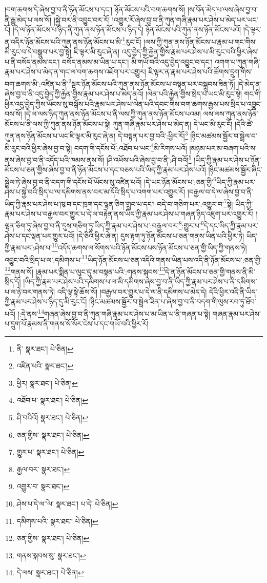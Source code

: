 །བག་ཆགས་དེ་ཞེས་བྱ་བ་ནི་ཉོན་མོངས་པ་དང་། ཉོན་མོངས་པའི་བག་ཆགས་སོ། །ས་བོན་མེད་པ་ལས་ཞེས་བྱ་བ་ནི་རྒྱུ་མེད་པ་ལས་སོ། །སྐྱེ་བར་ནི་འབྱུང་བར་རོ། །འགྱུར་རོ་ཞེས་བྱ་བ་ནི་ཀུན་གཞི་རྣམ་པར་ཤེས་པ་མེད་པར་ཡང་ངོ། །དེ་ལ་ཉོན་མོངས་པ་ཉིད་ནི་ཀུན་ནས་ཉོན་མོངས་པ་ཉིད་དེ། ཉོན་མོངས་པའི་ཀུན་ནས་ཉོན་མོངས་པའོ། །དེ་ལྟར་ན་འདིར་ཉོན་མོངས་པའི་ཀུན་ནས་ཉོན་མོངས་པ་མི་\footnote{ནི་  སྣར་ཐང་།  པེ་ཅིན། }རུང་ངོ། །ལས་ཀྱི་ཀུན་ནས་ཉོན་མོངས་པ་རྣམ་པ་གང་གིས་མི་རུང་བ་དེ་བསྒྲུབ་པར་བྱ་སྟེ། ཇི་ལྟར་མི་རུང་ཞེ་ན། འདུ་བྱེད་ཀྱི་རྐྱེན་གྱིས་རྣམ་པར་ཤེས་པ་མི་རུང་བའི་ཕྱིར་ཞེས་པ་ནི་བསོད་ནམས་དང་། བསོད་ནམས་མ་ཡིན་པ་དང་། མི་གཡོ་བའི་འདུ་བྱེད་འབྱུང་བ་དང་། འགག་པ་ཀུན་གཞི་རྣམ་པར་ཤེས་པ་མེད་ན་གང་ལ་བག་ཆགས་འཇོག་པར་འགྱུར། ཇི་ལྟར་ན་རྣམ་པར་ཤེས་པའི་ཚོགས་དྲུག་གིས་བག་ཆགས་མི་:འཛིན་པ་ནི་\footnote{འཛིན་པའི་  སྣར་ཐང་། }སྔར་ཉོན་མོངས་པའི་ཀུན་ནས་ཉོན་མོངས་པ་བསྟན་པར་བསྒྲུབས་ཟིན་ཏོ། །དེ་མེད་ན་ཞེས་བྱ་བ་ནི་འདུ་བྱེད་ཀྱི་རྐྱེན་གྱིས་རྣམ་པར་ཤེས་པ་མེད་ནའོ། །ལེན་པའི་རྐྱེན་གྱིས་སྲེད་པ་ཡང་མི་རུང་སྟེ། གང་གི་ཕྱིར་འདུ་བྱེད་ཀྱིས་ཡོངས་སུ་བསྒོས་པའི་རྣམ་པར་ཤེས་པ་ལེན་པའི་དབང་གིས་བག་ཆགས་རྒྱས་པས་སྲིད་པ་འབྱུང་བས་སོ། །དེ་ལ་ལས་ཉིད་ཀུན་ནས་ཉོན་མོངས་པ་ནི་ལས་ཀྱི་ཀུན་ནས་ཉོན་མོངས་པའམ། ལས་ལས་ཀུན་ནས་ཉོན་མོངས་པ་ནི་ལས་ཀྱི་ཀུན་ནས་ཉོན་མོངས་པ་སྟེ། ཀུན་གཞི་རྣམ་པར་ཤེས་པ་མེད་ན། དེ་ཡང་མི་རུང་ངོ། །དེའི་ཚེ་ཀུན་ནས་ཉོན་མོངས་པ་ཡང་ཇི་ལྟར་མི་རུང་ཞེ་ན། དེ་བསྟན་པར་བྱ་བའི་:ཕྱིར་རོ།\footnote{ཕྱིར།  སྣར་ཐང་།  པེ་ཅིན། } །ཉིང་མཚམས་སྦྱོར་བ་སྦྲེལ་བ་མི་རུང་བའི་ཕྱིར་ཞེས་བྱ་བ་སྟེ། བདག་གི་དངོས་པོ་:འཐོབ་པ་ཡང་\footnote{འཐོབ་པ་  སྣར་ཐང་།  པེ་ཅིན། }མི་རིགས་པའོ། །མཉམ་པར་མ་བཞག་པའི་ས་ནས་ཞེས་བྱ་བ་ནི་འདོད་པའི་ཁམས་ནས་སོ། །ཤི་འཕོས་པའི་ཞེས་བྱ་བ་ནི་:ཤི་བའོ།\footnote{ཤི་བའིའོ།  སྣར་ཐང་།  པེ་ཅིན། } །ཡིད་ཀྱི་རྣམ་པར་ཤེས་པ་ཉོན་མོངས་པ་ཅན་གྱིས་ཞེས་བྱ་བ་ནི་ཉོན་མོངས་པ་དང་བཅས་པའི་ཡིད་ཀྱི་རྣམ་པར་ཤེས་པའོ། །ཉིང་མཚམས་སྦྱོར་ཞིང་སྦྲེལ་ཏེ་ཞེས་བྱ་བ་ནི་བདག་གི་དངོས་པོ་ཡོངས་སུ་འཛིན་པའོ། །དེ་ཡང་ཉོན་མོངས་པ་:ཅན་གྱི་\footnote{ཅན་གྱིས་  སྣར་ཐང་།  པེ་ཅིན། }ཡིད་ཀྱི་རྣམ་པར་ཤེས་པ་སྐྱེ་བའི་སྲིད་པ་ལ་དམིགས་ནས་བར་མ་དོའི་སྲིད་པ་འགག་པར་འགྱུར་རོ། །བརྒྱལ་བ་དེ་ལ་ཞེས་བྱ་བ་ནི་ཡིད་ཀྱི་རྣམ་པར་ཤེས་པ་ཁུ་བ་དང་ཁྲག་དང་ལྷན་ཅིག་གྲུབ་པ་དང་། བདེ་བ་གཅིག་པར་:འགྱུར་བ་\footnote{གྱུར་པ་  སྣར་ཐང་།  པེ་ཅིན། }སྟེ། ཡིད་ཀྱི་རྣམ་པར་ཤེས་པ་བརྒྱལ་བར་གྱུར་པ་དེ་ལ་བརྟེན་ནས་ཡིད་ཀྱི་རྣམ་པར་ཤེས་པ་གཞན་ཉིད་འཇུག་པར་འགྱུར་རོ། །ལྷན་ཅིག་ཏུ་ཞེས་བྱ་བ་ནི་དུས་གཅིག་ཏུ་ཡིད་ཀྱི་རྣམ་པར་ཤེས་པ་:བརྒྱལ་བར་\footnote{རྒྱལ་བར་  སྣར་ཐང་། }:གྱུར་པ་\footnote{འགྱུར་བ་  སྣར་ཐང་། }དེ་དང་ཡིད་ཀྱི་རྣམ་པར་ཤེས་པ་དང་ལྡན་པར་གྱུར་པའོ། །དེ་ཅིའི་ཕྱིར་ཞེ་ན། དུས་རྟག་ཏུ་ཉོན་མོངས་པ་ཅན་གནས་ཡིན་པའི་ཕྱིར་ཏེ། ཡིད་ཀྱི་རྣམ་པར་:ཤེས་པ་\footnote{ཤེས་པ་དེ་ལ་ེ་ལ་  སྣར་ཐང་། པ་དེ་  པེ་ཅིན། }འདོད་ཆགས་ལ་སོགས་པའི་ཉོན་མོངས་པས་ཉོན་མོངས་པ་ཅན་གྱི་ཡིད་ཀྱི་གནས་ཏེ། འབྱུང་བའི་སྲིད་པ་ལ་:དམིགས་པ་\footnote{དམིགས་པའི་  སྣར་ཐང་།  པེ་ཅིན། }ཡིད་ཉོན་མོངས་པ་ཅན་འདིའི་གནས་ཡིན་པས་འདི་ནི་ཉོན་མོངས་པ་:ཅན་གྱི་\footnote{ཅན་གྱིས་  སྣར་ཐང་།  པེ་ཅིན། }གནས་སོ། །རྣམ་པར་སྨིན་པ་ལུང་དུ་མ་བསྟན་པའི་:གནས་སྐབས་\footnote{གནས་སྐབས་སུ་  སྣར་ཐང་། }དེ་ན་ཉོན་མོངས་པ་ཅན་གྱི་གནས་ནི་མི་སྲིད་དོ། །ཡིད་ཀྱི་རྣམ་པར་ཤེས་པའི་དམིགས་པ་ལ་མི་དམིགས་ཞེས་བྱ་བ་ནི་ཡིད་ཀྱི་རྣམ་པར་ཤེས་པ་ནི་དམིགས་པ་ལ་ཉེ་བར་གནས་ཏེ། འདི་ལྟ་སྟེ་ཆོས་སོ། །བརྒྱལ་བར་གྱུར་པ་དེ་ལ་ནི་དམིགས་པ་མེད་དེ། དེའི་ཕྱིར་འདི་ནི་ཡིད་ཀྱི་རྣམ་པར་ཤེས་པ་ཉིད་དུ་མི་རུང་ངོ། །ཉིང་མཚམས་སྦྱོར་བ་སྦྲེལ་ཟིན་པ་ཞེས་བྱ་བ་ནི་བདག་གི་ལུས་རབ་ཏུ་ཐོབ་པའོ། །:དེ་ནས་\footnote{དེ་ལས་  སྣར་ཐང་།  པེ་ཅིན། }གཞན་ཞེས་བྱ་བ་ནི་ཀུན་གཞི་རྣམ་པར་ཤེས་པ་མ་ཡིན་པ་ནི་གཞན་པ་སྟེ། གཞན་རྣམ་པར་ཤེས་པ་དྲུག་པོ་རྣམས་ནི་གནས་སོ་སོར་ངེས་པ་དང་གཡོ་བའི་ཕྱིར་རོ། 